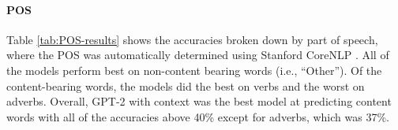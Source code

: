 \documentclass[11pt]{article}
\begin{document}
\paragraph{POS} Table \ref{tab:POS-results} shows the accuracies broken down by part of speech, where the POS was automatically determined using Stanford CoreNLP  \cite{manning2014corenlp}.  All of the models perform best on non-content bearing words (i.e., ``Other'').  Of the content-bearing words, the models did the best on verbs and the worst on adverbs.  Overall, GPT-2 with context was the best model at predicting content words with all of the accuracies above 40\% except for adverbs, which was 37\%.

\begin{table}[t]
\centering
{}
\caption{\label{tab:POS-results} Accuracy of the RoBERTa, BERT, XLNet, and GPT-2 with and without context by part-of-speech on the test data.}
\end{table}


\end{document}
